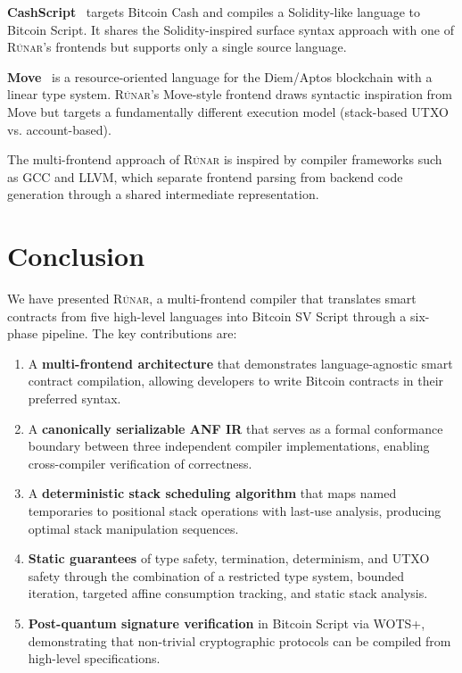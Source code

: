 \documentclass[11pt,a4paper]{article}
\newcommand{\runar}{\textsc{Rúnar}}
\begin{document}
\textbf{CashScript}~\cite{cashscript} targets Bitcoin Cash and compiles
a Solidity-like language to Bitcoin Script. It shares the Solidity-inspired
surface syntax approach with one of \runar{}'s frontends but supports only a
single source language.

\textbf{Move}~\cite{move} is a resource-oriented language for the Diem/Aptos
blockchain with a linear type system. \runar{}'s Move-style frontend draws
syntactic inspiration from Move but targets a fundamentally different
execution model (stack-based UTXO vs. account-based).

The multi-frontend approach of \runar{} is inspired by compiler frameworks
such as GCC and LLVM, which separate frontend parsing from backend code
generation through a shared intermediate representation.

\section{Conclusion}
\label{sec:conclusion}

We have presented \runar{}, a multi-frontend compiler that translates smart
contracts from five high-level languages into Bitcoin SV Script through a
six-phase pipeline. The key contributions are:

\begin{enumerate}[label=(\roman*)]
  \item A \textbf{multi-frontend architecture} that demonstrates
    language-agnostic smart contract compilation, allowing developers to
    write Bitcoin contracts in their preferred syntax.
  \item A \textbf{canonically serializable ANF IR} that serves as a formal
    conformance boundary between three independent compiler implementations,
    enabling cross-compiler verification of correctness.
  \item A \textbf{deterministic stack scheduling algorithm} that maps named
    temporaries to positional stack operations with last-use analysis,
    producing optimal stack manipulation sequences.
  \item \textbf{Static guarantees} of type safety, termination, determinism,
    and UTXO safety through the combination of a restricted type system,
    bounded iteration, targeted affine consumption tracking, and static
    stack analysis.
  \item \textbf{Post-quantum signature verification} in Bitcoin Script
    via WOTS+, demonstrating that non-trivial cryptographic protocols can
    be compiled from high-level specifications.
\end{enumerate}
\end{document}
